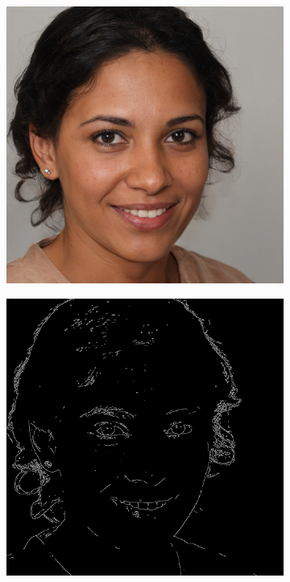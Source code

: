 \documentclass{70_styles/svproc}
\begin{document}
\begin{figure}
     \centering
     \begin{subfigure}[b]{0.2\textwidth}
         \centering
         \includegraphics[width=\textwidth]{70_figures/seed0028.png}
     \end{subfigure}
     \begin{subfigure}[b]{0.2\textwidth}
         \centering
         \includegraphics[width=\textwidth]{70_figures/canny-seed0028.png}

\end{subfigure}
\end{figure}
\end{document}
